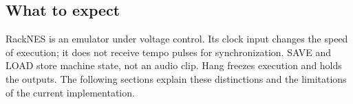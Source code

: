 \subsection{What to expect}
RackNES is an emulator under voltage control. Its clock input changes the
speed of execution; it does not receive tempo pulses for synchronization.
SAVE and LOAD store machine state, not an audio clip. Hang freezes execution
and holds the outputs. The following sections explain these distinctions
and the limitations of the current implementation.
